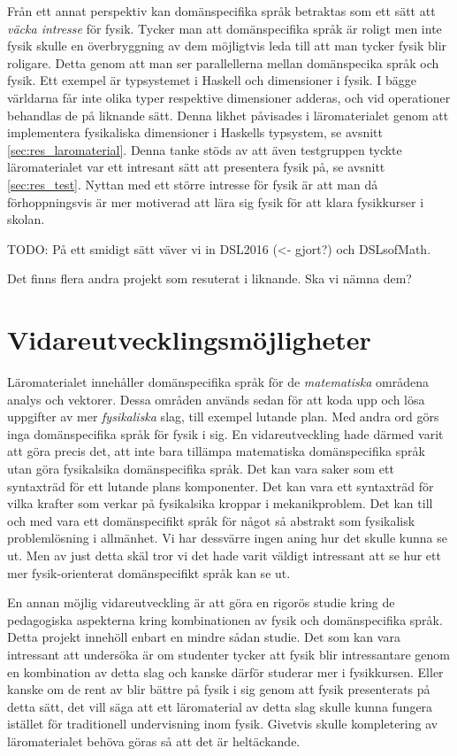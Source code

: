 \begin{draft}
Från ett annat perspektiv kan domänspecifika språk betraktas som ett sätt att
\textit{väcka intresse} för fysik. Tycker man att domänspecifika språk är roligt
men inte fysik skulle en överbryggning av dem möjligtvis leda till att man tycker fysik
blir roligare. Detta genom att man ser parallellerna mellan
domänspecika språk och fysik. Ett exempel är typsystemet i Haskell och
dimensioner i fysik. I bägge världarna får inte olika typer respektive
dimensioner adderas, och vid operationer behandlas de på liknande sätt. Denna
likhet påvisades i läromaterialet genom att implementera fysikaliska dimensioner
i Haskells typsystem, se avsnitt \ref{sec:res_laromaterial}. Denna tanke stöds
av att även testgruppen tyckte läromaterialet var ett intresant sätt att
presentera fysik på, se avsnitt \ref{sec:res_test}. Nyttan med ett större
intresse för fysik är att man då förhoppningsvis är mer motiverad att lära sig
fysik för att klara fysikkurser i skolan. 

\begin{binge}
TODO: På ett smidigt sätt väver vi in DSL2016 (<- gjort?) och DSLsofMath.

Det finns flera andra projekt som resuterat i liknande. Ska vi nämna dem?
\end{binge}

\section{Vidareutvecklingsmöjligheter}

Läromaterialet innehåller domänspecifika språk för de \textit{matematiska}
områdena analys och vektorer. Dessa områden används sedan för att koda upp och
lösa uppgifter av mer \textit{fysikaliska} slag, till exempel lutande plan. Med
andra ord görs inga domänspecifika språk för fysik i sig. En vidareutveckling
hade därmed varit att göra precis det, att inte bara tillämpa matematiska
domänspecifika språk utan göra fysikalsika domänspecifika språk. Det kan vara
saker som ett syntaxträd för ett lutande plans komponenter. Det kan vara ett
syntaxträd för vilka krafter som verkar på fysikalsika kroppar i mekanikproblem.
Det kan till och med vara ett domänspecifikt språk för något så abstrakt som
fysikalisk problemlösning i allmänhet. Vi har dessvärre ingen aning hur det
skulle kunna se ut. Men av just detta skäl tror vi det hade varit väldigt
intressant att se hur ett mer fysik-orienterat domänspecifikt språk kan se ut.

En annan möjlig vidareutveckling är att göra en rigorös studie kring de
pedagogiska aspekterna kring kombinationen av fysik och domänspecifika språk.
Detta projekt innehöll enbart en mindre sådan studie. Det som kan vara
intressant att undersöka är om studenter tycker att fysik blir intressantare
genom en kombination av detta slag och kanske därför studerar mer i fysikkursen.
Eller kanske om de rent av blir bättre på fysik i sig genom att fysik
presenterats på detta sätt, det vill säga att ett läromaterial av detta slag
skulle kunna fungera istället för traditionell undervisning inom fysik. Givetvis
skulle kompletering av läromaterialet behöva göras så att det är heltäckande.


\end{draft}

